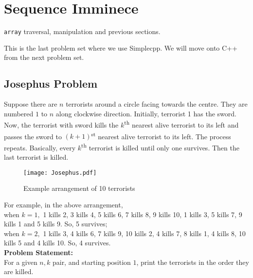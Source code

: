 \section{Sequence Imminece}{\label{sec:sequences}}
\begin{topics}
\verb!array! traversal, manipulation and previous sections.
\end{topics}
\begin{note}
	This is the last problem set where we use Simplecpp. We will move onto C++ from the next problem set.
\end{note}
\subsection{Josephus Problem}
Suppose there are $n$ terrorists around a circle facing towards the centre. They are numbered $1$ to $n$ along clockwise direction. Initially, terrorist 1 has the sword. Now, the terrorist with sword kills the $k$\textsuperscript{th} nearest alive terrorist to its left and passes the sword to $(k+1)$\textsuperscript{st} nearest alive terrorist to its left. The process repeats. Basically, every $k$\textsuperscript{th} terrorist is killed until only one survives. Then the last terrorist is killed.
\begin{figure}[H]
    \centering
    \texttt{[image: Josephus.pdf]}
    \caption{Example arrangement of 10 terrorists}
    \label{fig:jp}
\end{figure}
\vspace{-1.5em}
For example, in the above arrangement,\\
when $k=1,$ 1 kills 2, 3 kills 4, 5 kills 6, 7 kills 8, 9 kills 10, 1 kills 3, 5 kills 7, 9 kills 1 and 5 kills 9. So, 5 survives;\\%
when $k=2,$ 1 kills 3, 4 kills 6, 7 kills 9, 10 kills 2, 4 kills 7, 8 kills 1, 4 kills 8, 10 kills 5 and 4 kills 10. So, 4 survives.\\%
\textbf{Problem Statement:}\\
For a given $n, k$ pair, and starting position $1$, print the terrorists in the order they are killed.
